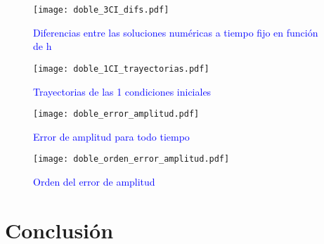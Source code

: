 \documentclass[aps,prb,twocolumn,superscriptaddress,floatfix,longbibliography]{revtex4-2}
\newcounter{para}
\begin{document}
\begin{figure}[h]
  \texttt{[image: doble\_3CI\_difs.pdf]}
  \caption{\textcolor{blue}{Diferencias entre las soluciones numéricas a tiempo fijo en función de h}}
   \label{fig:doble_3CI_difs}
\end{figure}

\begin{figure}[h]
  \texttt{[image: doble\_1CI\_trayectorias.pdf]}
  \caption{\textcolor{blue}{Trayectorias de las 1 condiciones iniciales}}
   \label{fig:doble_1CI_trayectorias}
\end{figure}

\begin{figure}[h]
  \texttt{[image: doble\_error\_amplitud.pdf]}
  \caption{\textcolor{blue}{Error de amplitud para todo tiempo}}
   \label{fig:doble_error_amplitud.pdf}
\end{figure}

\begin{figure}[h]
  \texttt{[image: doble\_orden\_error\_amplitud.pdf]}
  \caption{\textcolor{blue}{Orden del error de amplitud}}
   \label{fig:doble_orden_error_amplitud}
\end{figure}


\section{Conclusión}





\end{document}
